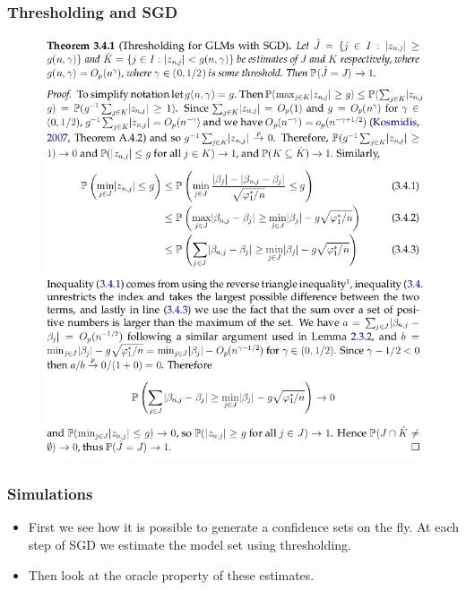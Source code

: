 \documentclass{beamer}
\begin{document}
\begin{frame}
  \frametitle{Thresholding and SGD}
  \begin{figure}[h!]
    \centering
    \includegraphics[scale=0.275]{cons_sgd.png}
  \end{figure}
\end{frame}

\begin{frame}
  \frametitle{Simulations}
  \begin{itemize}
  \item First we see how it is possible to generate a confidence sets on the fly. At each step of SGD we estimate the model set using thresholding.
  \item Then look at the oracle property of these estimates.
  \end{itemize}
\end{frame}
\end{document}
